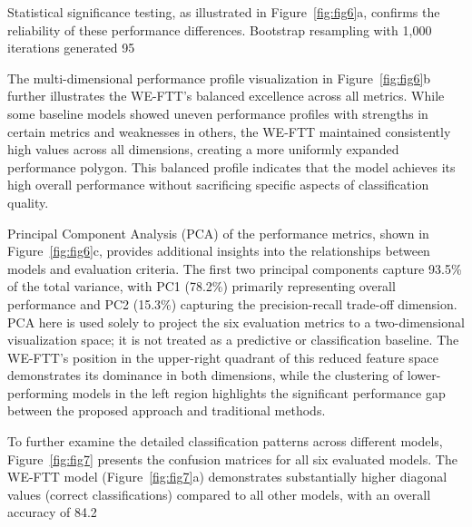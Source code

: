\documentclass[preprint,review,12pt,authoryear]{elsarticle}
\begin{document}
Statistical significance testing, as illustrated in Figure~\ref{fig:fig6}a, confirms the reliability of these performance differences. Bootstrap resampling with 1,000 iterations generated 95%

The multi-dimensional performance profile visualization in Figure~\ref{fig:fig6}b further illustrates the WE-FTT's balanced excellence across all metrics. While some baseline models showed uneven performance profiles with strengths in certain metrics and weaknesses in others, the WE-FTT maintained consistently high values across all dimensions, creating a more uniformly expanded performance polygon. This balanced profile indicates that the model achieves its high overall performance without sacrificing specific aspects of classification quality.

Principal Component Analysis (PCA) of the performance metrics, shown in Figure~\ref{fig:fig6}c, provides additional insights into the relationships between models and evaluation criteria. The first two principal components capture 93.5\% of the total variance, with PC1 (78.2\%) primarily representing overall performance and PC2 (15.3\%) capturing the precision-recall trade-off dimension. PCA here is used solely to project the six evaluation metrics to a two-dimensional visualization space; it is not treated as a predictive or classification baseline. The WE-FTT's position in the upper-right quadrant of this reduced feature space demonstrates its dominance in both dimensions, while the clustering of lower-performing models in the left region highlights the significant performance gap between the proposed approach and traditional methods.

To further examine the detailed classification patterns across different models, Figure~\ref{fig:fig7} presents the confusion matrices for all six evaluated models. The WE-FTT model (Figure~\ref{fig:fig7}a) demonstrates substantially higher diagonal values (correct classifications) compared to all other models, with an overall accuracy of 84.2%
\end{document}
